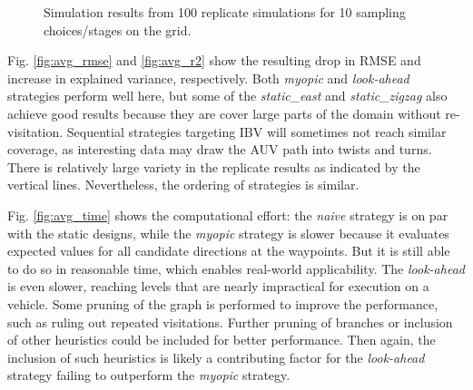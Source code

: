 \documentclass[aoas]{imsart}
\begin{document}
\begin{figure}[h!]
  \hfill 
\caption{Simulation results from 100 replicate simulations for 10
  sampling choices/stages on the grid. }  
\label{fig:sim_results}
\end{figure}

Fig. \ref{fig:avg_rmse} and \ref{fig:avg_r2} show the resulting drop
in RMSE and increase in explained variance, respectively. Both
\textit{myopic} and \textit{look-ahead} strategies perform well here,
but some of the \textit{static\_east} and \textit{static\_zigzag} also
achieve good results because they are cover large
parts of the domain without re-visitation. Sequential strategies
targeting IBV will sometimes not reach similar coverage, as
interesting data may draw the AUV path into twists and turns. There is
relatively large variety in the replicate results as indicated by the
vertical lines. Nevertheless, the ordering of strategies is similar.


Fig. \ref{fig:avg_time} shows the computational effort: the
\textit{naive} strategy is on par with the static designs, while the
\textit{myopic} strategy is slower because it evaluates expected values for all candidate directions at the waypoints. But it is still able to do so in reasonable time, which enables real-world applicability. The \textit{look-ahead} is even
slower, reaching levels that are nearly impractical for execution on a
vehicle. Some pruning of the graph is performed to improve the
performance, such as ruling out repeated visitations. Further pruning of branches or
inclusion of other heuristics could be included for better
performance. Then again, the inclusion of such heuristics is likely a
contributing factor for the \textit{look-ahead} strategy failing to
outperform the \textit{myopic} strategy.
\end{document}
